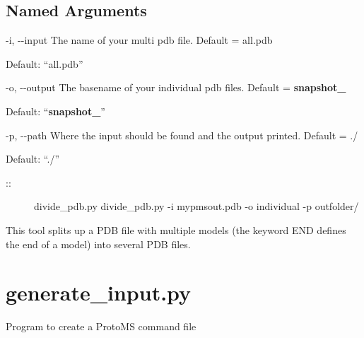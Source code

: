 \documentclass[letterpaper,10pt,english]{sphinxmanual}
\begin{document}
\subsection{Named Arguments}
\label{\detokenize{tools:Named Arguments}}\begin{optionlist}{3cm}
\item [-i, -{-}input]  
The name of your multi pdb file. Default = all.pdb

Default: “all.pdb”
\item [-o, -{-}output]  
The basename of your individual pdb files. Default = {\color{red}\bfseries{}snapshot\_}

Default: “{\color{red}\bfseries{}snapshot\_}”
\item [-p, -{-}path]  
Where the input should be found and the output printed. Default = ./

Default: “./”
\end{optionlist}

\begin{description}
\item[{::}] \leavevmode
divide\_pdb.py
divide\_pdb.py -i mypmsout.pdb -o individual -p outfolder/

\end{description}


This tool splits up a PDB file with multiple models (the keyword END defines the end of a model) into several PDB files.


\section{generate\_input.py}
\label{\detokenize{tools:generate-input-py}}

Program to create a ProtoMS command file
\end{document}
